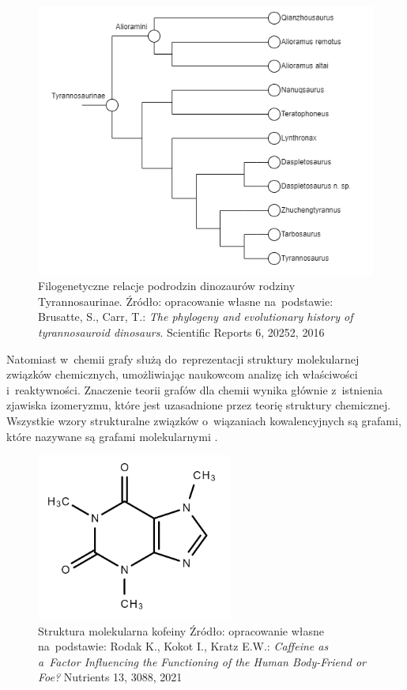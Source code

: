 \begin{figure}[ht]
	\centering
	\includegraphics[width=12cm]{resources/introduction/images/dino.png}
	\caption{Filogenetyczne relacje podrodzin dinozaurów rodziny Tyrannosaurinae.
		Źródło: opracowanie własne na~podstawie:
		Brusatte, S., Carr, T.: \textit{The phylogeny and evolutionary history of tyrannosauroid dinosaurs}. Scientific Reports 6, 20252, 2016}
    \label{Fig:intro-3}
\end{figure}
\FloatBarrier

Natomiast w~chemii grafy służą do~reprezentacji struktury molekularnej związków chemicznych,
umożliwiając naukowcom analizę ich właściwości i~reaktywności.
Znaczenie teorii grafów dla chemii wynika głównie z~istnienia zjawiska izomeryzmu,
które jest uzasadnione przez teorię struktury chemicznej.
Wszystkie wzory strukturalne związków o~wiązaniach kowalencyjnych są grafami,
które nazywane są grafami molekularnymi \cite{Balaban1985}.

\begin{figure}[ht]
	\centering
	\includegraphics[height=5.5cm]{resources/introduction/images/chem.png}
	\caption{Struktura molekularna kofeiny
		Źródło: opracowanie własne na~podstawie:
		Rodak K., Kokot I., Kratz E.W.: \textit{Caffeine as a~Factor Influencing the Functioning of the Human Body-Friend or Foe?} Nutrients 13, 3088, 2021}
    \label{Fig:intro-4}
\end{figure}
\FloatBarrier


